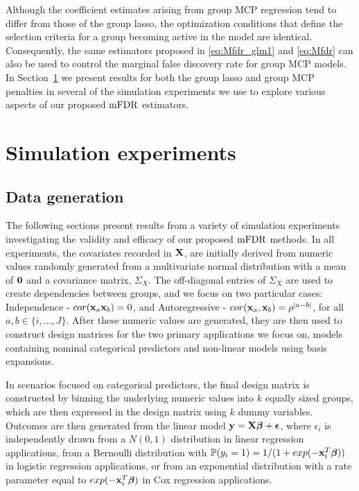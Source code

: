Although the coefficient estimates arising from group MCP regression tend to differ from those of the group lasso, the optimization conditions that define the selection criteria for a group becoming active in the model are identical. Consequently, the same estimators proposed in \ref{eq:Mfdr_glm1} and \ref{eq:Mfdr} can also be used to control the marginal false discovery rate for group MCP models. In Section~\ref{Sec:sim} we present results for both the group lasso and group MCP penalties in several of the simulation experiments we use to explore various aspects of our proposed $\textrm{mFDR}$ estimators.

\section{Simulation experiments}
\label{Sec:sim}

\subsection{Data generation}

The following sections present results from a variety of simulation experiments investigating the validity and efficacy of our proposed $\textrm{mFDR}$ methods. In all experiments, the covariates recorded in $\mathbf{X}$, are initially derived from numeric values randomly generated from a multivariate normal distribution with a mean of $\mathbf{0}$ and a covariance matrix, $\Sigma_X$. The off-diagonal entries of $\Sigma_X$ are used to create dependencies between groups, and we focus on two particular cases: Independence - $cor(\mathbf{x}_a \mathbf{x}_b) = 0$, and Autoregressive - $cor(\mathbf{x}_a, \mathbf{x}_b) = \rho^{|a - b|}$, for all $a, b \in \{i,\ldots,J\}$. After these numeric values are generated, they are then used to construct design matrices for the two primary applications we focus on, models containing nominal categorical predictors and non-linear models using basis expansions.

In scenarios focused on categorical predictors, the final design matrix is constructed by binning the underlying numeric values into $k$ equally sized groups, which are then expressed in the design matrix using $k$ dummy variables. Outcomes are then generated from the linear model $\mathbf{y} = \mathbf{X} \boldsymbol{\beta}+ \boldsymbol{\epsilon}$, where $\epsilon_i$ is independently drawn from a $N(0,1)$ distribution in linear regression applications, from a Bernoulli distribution with $\mathbb{P}(y_i = 1) = 1/(1 + exp(-\mathbf{x}_i^T\boldsymbol{\beta}))$ in logistic regression applications, or from an exponential distribution with a rate parameter equal to $exp(-\mathbf{x}_i^T\boldsymbol{\beta})$ in Cox regression applications.

